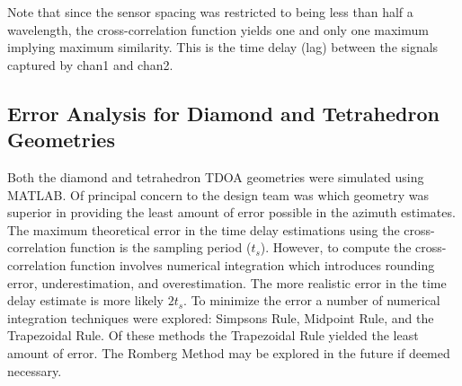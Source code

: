 \documentclass[12pt]{article}
\begin{document}
\noindent Note that since the sensor spacing was restricted to being less than half a wavelength, the cross-correlation function yields one and only one maximum implying maximum similarity. This is the time delay (lag) between the signals captured by chan1 and chan2.

\subsection{Error Analysis for Diamond and Tetrahedron Geometries}

\noindent Both the diamond and tetrahedron TDOA geometries were simulated using MATLAB. Of principal concern to the design team was which geometry was superior in providing the least amount of error possible in the azimuth estimates.\\

\noindent The maximum theoretical error in the time delay estimations using the cross-correlation function is the sampling period ($t_s$). However, to compute the cross-correlation function involves numerical integration which introduces rounding error, underestimation, and overestimation. The more realistic error in the time delay estimate is more likely $2t_s$. To minimize the error a number of numerical integration techniques were explored: Simpsons Rule, Midpoint Rule, and the Trapezoidal Rule. Of these methods the Trapezoidal Rule yielded the least amount of error. The Romberg Method may be explored in the future if deemed necessary. 

\pagebreak
\end{document}
